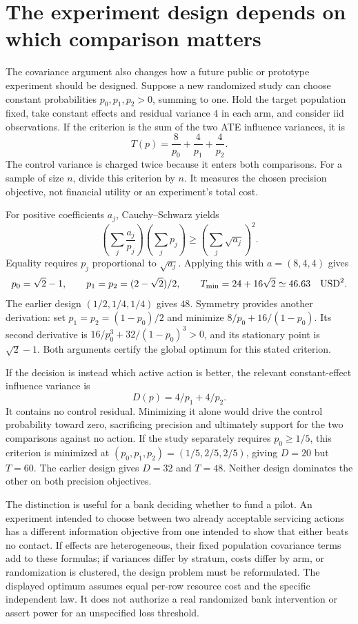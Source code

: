 \section{The experiment design depends on which comparison matters}
\label{exec17:s4-design-criterion}

The covariance argument also changes how a future public or prototype
experiment should be designed. Suppose a new randomized study can choose
constant probabilities $p_0,p_1,p_2>0$, summing to one. Hold the target
population fixed, take constant effects and residual variance $4$ in each
arm, and consider iid observations. If the criterion is the sum of the
two ATE influence variances, it is
\begin{equation}
 T(p)=\frac{8}{p_0}+\frac{4}{p_1}+\frac{4}{p_2}.
 \label{exec17:s4-design-trace}
\end{equation}
The control variance is charged twice because it enters both comparisons.
For a sample of size $n$, divide this criterion by $n$. It measures the
chosen precision objective, not financial utility or an experiment's total
cost.

For positive coefficients $a_j$, Cauchy--Schwarz yields
\[
 \left(\sum_j\frac{a_j}{p_j}\right)\left(\sum_jp_j\right)
       \geq\left(\sum_j\sqrt{a_j}\right)^2.
\]
Equality requires $p_j$ proportional to $\sqrt{a_j}$. Applying this with
$a=(8,4,4)$ gives
\[
 p_0=\sqrt2-1,\qquad p_1=p_2=(2-\sqrt2)/2,\qquad
 T_{\min}=24+16\sqrt2\simeq46.63\quad {\rm USD}^2.
\]
The earlier design $(1/2,1/4,1/4)$ gives $48$. Symmetry provides another
derivation: set $p_1=p_2=(1-p_0)/2$ and minimize
$8/p_0+16/(1-p_0)$. Its second derivative is
$16/p_0^3+32/(1-p_0)^3>0$, and its stationary point is $\sqrt2-1$.
Both arguments certify the global optimum for this stated criterion.
\citep{exec17_s4_extension}

If the decision is instead which active action is better, the relevant
constant-effect influence variance is
\[
 D(p)=4/p_1+4/p_2.
\]
It contains no control residual. Minimizing it alone would drive the
control probability toward zero, sacrificing precision and ultimately
support for the two comparisons against no action. If the study separately
requires $p_0\geq1/5$, this criterion is minimized at
$(p_0,p_1,p_2)=(1/5,2/5,2/5)$, giving $D=20$ but $T=60$.
The earlier design gives $D=32$ and $T=48$. Neither design dominates the
other on both precision objectives.

The distinction is useful for a bank deciding whether to fund a pilot.
An experiment intended to choose between two already acceptable servicing
actions has a different information objective from one intended to show
that either beats no contact. If effects are heterogeneous, their fixed
population covariance terms add to these formulas; if variances differ
by stratum, costs differ by arm, or randomization is clustered, the design
problem must be reformulated. The displayed optimum assumes equal per-row
resource cost and the specific independent law. It does not authorize a
real randomized bank intervention or assert power for an unspecified loss
threshold.

